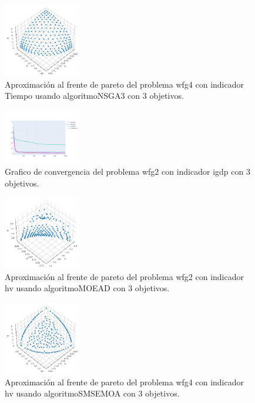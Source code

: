 \documentclass{article}
\begin{document}
\begin{figure}
	\includegraphics[width=0.3\textwidth]{NSGA3_wfg4_Tiempo_3_fp.png}
	\caption{Aproximación al frente de pareto del problema wfg4 con indicador Tiempo usando algoritmoNSGA3 con 3 objetivos.}
\end{figure}
\clearpage
\begin{figure}
	\includegraphics[width=0.3\textwidth]{wfg2_igdp_3_gc.png}
	\caption{Grafico de convergencia del problema wfg2 con indicador igdp con 3 objetivos.}
\end{figure}
\begin{figure}
	\includegraphics[width=0.3\textwidth]{MOEAD_wfg2_hv_3_fp.png}
	\caption{Aproximación al frente de pareto del problema wfg2 con indicador hv usando algoritmoMOEAD con 3 objetivos.}
\end{figure}
\begin{figure}
	\includegraphics[width=0.3\textwidth]{SMSEMOA_wfg4_hv_3_fp.png}
	\caption{Aproximación al frente de pareto del problema wfg4 con indicador hv usando algoritmoSMSEMOA con 3 objetivos.}
\end{figure}
\end{document}

